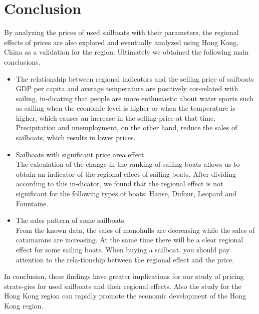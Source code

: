 \section{Conclusion}
By analyzing the prices of used sailboats with their parameters, the regional effects of prices are also explored and eventually analyzed using Hong Kong, China as a validation for the region. Ultimately we obtained the following main conclusions.
\begin{itemize}
    \setlength{\parsep}{0ex} %
    \setlength{\topsep}{2ex} %
    \setlength{\itemsep}{1ex} %
    \item The relationship between regional indicators and the selling price of sailboats\\
    GDP per capita and average temperature are positively cor-related with sailing, in-dicating that people are more enthusiastic about water sports such as sailing when the economic level is higher or when the temperature is higher, which causes an increase in the selling price at that time. Precipitation and unemployment, on the other hand, reduce the sales of sailboats, which results in lower prices.
    \item Sailboats with significant price area effect\\
    The calculation of the change in the ranking of sailing boats allows us to obtain an indicator of the regional effect of sailing boats. After dividing according to this in-dicator, we found that the regional effect is not significant for the following types of boats: Hanse, Dufour, Leopard and Fountaine.
    \item The sales pattern of some sailboats\\
    From the known data, the sales of monohulls are decreasing while the sales of catamarans are increasing. At the same time there will be a clear regional effect for some sailing boats. When buying a sailboat, you should pay attention to the rela-tionship between the regional effect and the price.
\end{itemize}

In conclusion, these findings have greater implications for our study of pricing strate-gies for used sailboats and their regional effects. Also the study for the Hong Kong region can rapidly promote the economic development of the Hong Kong region.

